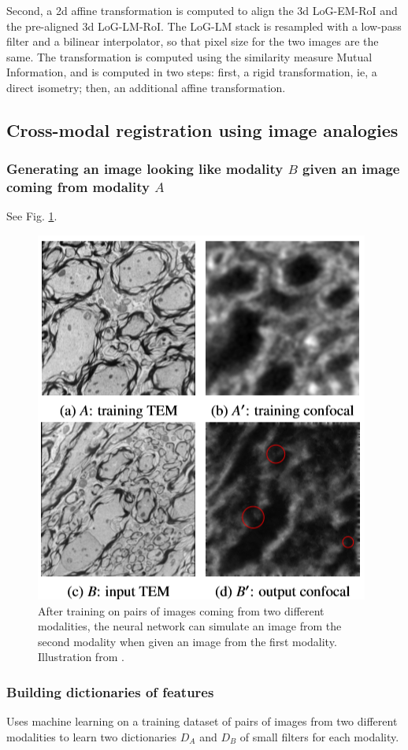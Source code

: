 \documentclass[11pt]{article} %
\begin{document}
Second, a 2d affine transformation is computed to align the 3d LoG-EM-RoI and the pre-aligned 3d LoG-LM-RoI. The LoG-LM stack is resampled with a low-pass filter and a bilinear interpolator, so that pixel size for the two images are the same. The transformation is computed using the similarity measure Mutual Information, and is computed in two steps: first, a rigid transformation, ie, a direct isometry; then, an additional affine transformation.

  \subsection{Cross-modal registration using image analogies}
    \subsubsection{Generating an image looking like modality $B$ given an image coming from modality $A$ \cite{hertzmann:analogies}}See Fig. \ref{fig:analogies}.
\begin{figure}[h!]
  \centering
  \includegraphics[width=0.60 \linewidth]{analogies.png}
  \caption{After training on pairs of images coming from two different modalities, the neural network can simulate an image from the second modality when given an image from the first modality. Illustration from \cite{cao:analogies}.}
  \label{fig:analogies}
\end{figure}
    \subsubsection{Building dictionaries of features \cite{cao:analogies}}
Uses machine learning on a training dataset of pairs of images from two different modalities to learn two dictionaries $D_A$ and $D_B$ of small filters for each modality.
\end{document}
